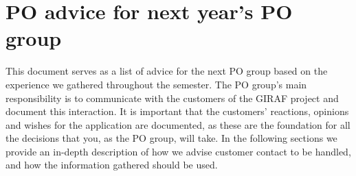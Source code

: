 \section{PO advice for next year's PO group} \label{appendix:PO-advice}
This document serves as a list of advice for the next PO group based on the experience we gathered throughout the semester.
The PO group's main responsibility is to communicate with the customers of the GIRAF project and document this interaction.
It is important that the customers' reactions, opinions and wishes for the application are documented, as these are the foundation for all the decisions that you, as the PO group, will take.
In the following sections we provide an in-depth description of how we advise customer contact to be handled, and how the information gathered should be used.

